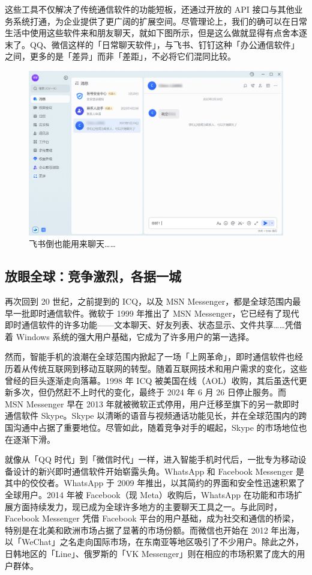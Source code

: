 这些工具不仅解决了传统通信软件的功能短板，还通过开放的 API 接口与其他业务系统打通，为企业提供了更广阔的扩展空间。尽管理论上，我们的确可以在日常生活中使用这些软件来和朋友聊天，就如下图所示，但是这么做就显得有点舍本逐末了。QQ、微信这样的「日常聊天软件」，与飞书、钉钉这种「办公通信软件」之间，更多的是「差异」而非「差距」，不必将它们混同比较。

\begin{figure}[htb!]
  \centering
  \includegraphics[width=.7\textwidth]{assets/software/Feishu_1.png}
  \caption{飞书倒也能用来聊天……}
  \label{fig:Feishu_2}
\end{figure}

\subsection{放眼全球：竞争激烈，各据一城}

再次回到 20 世纪，之前提到的 ICQ，以及 MSN Messenger，都是全球范围内最早一批即时通信软件。微软于 1999 年推出了 MSN Messenger，它已经有了现代即时通信软件的许多功能——文本聊天、好友列表、状态显示、文件共享……凭借着 Windows 系统的强大用户基础，它成为了许多用户的第一选择。

然而，智能手机的浪潮在全球范围内掀起了一场「上网革命」，即时通信软件也经历着从传统互联网到移动互联网的转型。随着互联网技术和用户需求的变化，这些曾经的巨头逐渐走向落幕。1998 年 ICQ 被美国在线（AOL）收购，其后虽迭代更新多次，但仍然赶不上时代的变化，最终于 2024 年 6 月 26 日停止服务。而 MSN Messenger 早在 2013 年就被微软正式停用，用户迁移至旗下的另一款即时通信软件 Skype。Skype 以清晰的语音与视频通话功能见长，并在全球范围内的跨国沟通中占据了重要地位。尽管如此，随着竞争对手的崛起，Skype 的市场地位也在逐渐下滑。

就像从「QQ 时代」到「微信时代」一样，进入智能手机时代后，一批专为移动设备设计的新兴即时通信软件开始崭露头角。WhatsApp 和 Facebook Messenger 是其中的佼佼者。WhatsApp 于 2009 年推出，以其简约的界面和安全性迅速积累了全球用户。2014 年被 Facebook（现 Meta）收购后，WhatsApp 在功能和市场扩展方面持续发力，现已成为全球许多地方的主要聊天工具之一。与此同时，Facebook Messenger 凭借 Facebook 平台的用户基础，成为社交和通信的桥梁，特别是在北美和欧洲市场占据了显著的市场份额。而微信也开始在 2012 年出海，以「WeChat」之名走向国际市场，在东南亚等地区吸引了不少用户。除此之外，日韩地区的「Line」、俄罗斯的「VK Messenger」则在相应的市场积累了庞大的用户群体。

